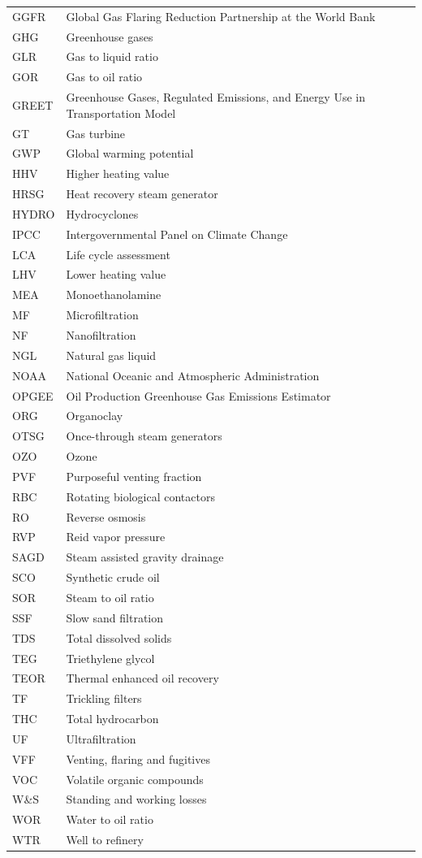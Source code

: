 \documentclass[11pt]{report}
\begin{document}
\begin{scriptsize}
\begin{supertabular*}{1\columnwidth}{p{0.15\columnwidth}p{0.8\columnwidth}}
GGFR & Global Gas Flaring Reduction Partnership at the World Bank\\
GHG & Greenhouse gases\\
GLR & Gas to liquid ratio\\
GOR & Gas to oil ratio\\
GREET & Greenhouse Gases, Regulated Emissions, and Energy Use in Transportation Model\\
GT & Gas turbine\\
GWP & Global warming potential\\
HHV & Higher heating value\\
HRSG & Heat recovery steam generator\\
HYDRO & Hydrocyclones\\
IPCC & Intergovernmental Panel on Climate Change\\
LCA & Life cycle assessment\\
LHV & Lower heating value\\
MEA & Monoethanolamine\\
MF & Microfiltration\\
NF & Nanofiltration\\
NGL & Natural gas liquid\\
NOAA & National Oceanic and Atmospheric Administration\\
OPGEE & Oil Production Greenhouse Gas Emissions Estimator\\
ORG & Organoclay\\
OTSG & Once-through steam generators\\
OZO & Ozone\\
PVF & Purposeful venting fraction\\
RBC & Rotating biological contactors\\
RO & Reverse osmosis\\
RVP & Reid vapor pressure \\
SAGD & Steam assisted gravity drainage\\
SCO & Synthetic crude oil\\
SOR & Steam to oil ratio\\
SSF & Slow sand filtration\\
TDS & Total dissolved solids\\
TEG & Triethylene glycol\\
TEOR & Thermal enhanced oil recovery\\
TF & Trickling filters\\
THC & Total hydrocarbon\\
UF & Ultrafiltration\\
VFF & Venting, flaring and fugitives\\
VOC & Volatile organic compounds\\
W\&S & Standing and working losses \\
WOR & Water to oil ratio\\
WTR & Well to refinery\\
\end{supertabular*}
\end{scriptsize}
\end{document}
